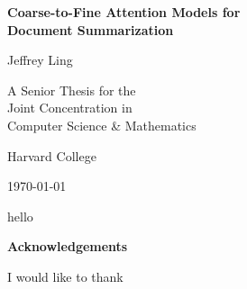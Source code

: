 \documentclass[12pt]{report}
\begin{document}


\begin{titlepage}
	\centering
	\vspace*{2cm}
	{\Huge\bfseries Coarse-to-Fine Attention Models for \\
				Document Summarization \par}
	\vfill
	{\LARGE Jeffrey Ling\par}
	\vspace{1cm}
	{\Large A Senior Thesis for the \\
		Joint Concentration in \\
	Computer Science \& Mathematics\par}
	\vspace{1cm}
	{\Large Harvard College\par}
	\vspace{1cm}
	{\Large \today }

	\vfill

\end{titlepage}
\onehalfspacing

\clearpage
\thispagestyle{empty}
\vspace*{4cm}
\begin{center}
 hello
\end{center}
\clearpage


\clearpage
\thispagestyle{empty}
\vspace*{2cm}
\begin{center}
\LARGE\bf Acknowledgements
\end{center}
\vspace{1cm}

I would like to thank


\clearpage %
\end{document}
